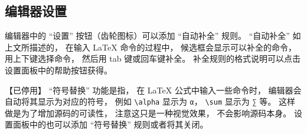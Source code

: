 \subsection{编辑器设置}
编辑器中的 “设置” 按钮（齿轮图标）可以添加 “自动补全” 规则。 “自动补全” 如上文所描述的， 在输入 LaTeX 命令的过程中， 候选框会显示可以补全的命令， 用上下键选择命令， 然后用 tab 键或回车键补全。 补全规则的格式说明可以点击设置面板中的帮助按钮获得。

【已停用】 “符号替换” 功能是指， 在 LaTeX 公式中输入一些命令时， 编辑器会自动将其显示为对应的符号， 例如 \verb|\alpha| 显示为 \lstinline|α|， \verb|\sum| 显示为 \lstinline|∑| 等。 这样做是为了增加源码的可读性， 注意这只是一种视觉效果， 不会影响源码本身。 设置面板中的也可以添加 “符号替换” 规则或者将其关闭。

